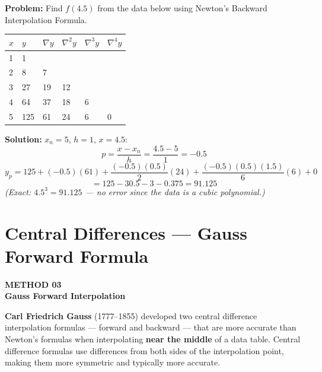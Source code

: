 \documentclass[12pt]{article}
\newcommand{\hcell}[1]{\textbf{\color{white}#1}}
\begin{document}
\begin{examplebox*}
\textbf{Problem:} Find $f(4.5)$ from the data below using Newton's Backward Interpolation Formula.

\begin{center}{\small
\begin{tabular}{C{2cm} C{2cm} C{2.5cm} C{2.5cm} C{2.5cm} C{2.5cm}}
\toprule
{}
\hcell{$x$} & \hcell{$y$} & \hcell{$\nabla y$} & \hcell{$\nabla^2 y$} & \hcell{$\nabla^3 y$} & \hcell{$\nabla^4 y$} \\
\midrule
{}
1 & 1    &    &    &   &   \\
2 & 8    &  7 &    &   &   \\
3 & 27   & 19 & 12 &   &   \\
4 & 64   & 37 & 18 & 6 &   \\
5 & 125  & 61 & 24 & 6 & 0 \\
\bottomrule
\end{tabular}
}\end{center}

\textbf{Solution:} $x_n = 5$, $h = 1$, $x = 4.5$:
\[
  p = \frac{x - x_n}{h} = \frac{4.5 - 5}{1} = -0.5
\]
\[
  y_p = 125 + (-0.5)(61) + \frac{(-0.5)(0.5)}{2}(24) + \frac{(-0.5)(0.5)(1.5)}{6}(6) + 0
\]
\[
  = 125 - 30.5 - 3 - 0.375 = \boxed{91.125}
\]
\textit{(Exact: $4.5^3 = 91.125$ — no error since the data is a cubic polynomial.)}
\end{examplebox*}

\newpage

\section{Central Differences — Gauss Forward Formula}

\begin{tcolorbox}[
  enhanced, arc=0pt, boxrule=0pt,
  colback=primary, colframe=primary,
  left=16pt, right=16pt, top=14pt, bottom=10pt,
  borderline south={4pt}{0pt}{accent},
]
  {\color{accent!70}\small\bfseries METHOD 03}\\[4pt]
  {\LARGE\bfseries\color{white} Gauss Forward Interpolation}
\end{tcolorbox}

\vspace{10pt}

\begin{histbox}
\textbf{Carl Friedrich Gauss} (1777--1855) developed two central difference interpolation formulas — forward and backward — that are more accurate than Newton's formulas when interpolating \textbf{near the middle} of a data table. Central difference formulas use differences from both sides of the interpolation point, making them more symmetric and typically more accurate.
\end{histbox}
\end{document}
